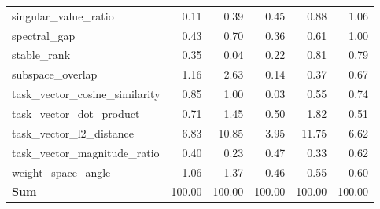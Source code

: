 \begin{table}[h]
\begin{tabular}{lrrrrr}
singular\_value\_ratio & 0.11 & 0.39 & 0.45 & 0.88 & 1.06 \\
spectral\_gap & 0.43 & 0.70 & 0.36 & 0.61 & 1.00 \\
stable\_rank & 0.35 & 0.04 & 0.22 & 0.81 & 0.79 \\
subspace\_overlap & 1.16 & 2.63 & 0.14 & 0.37 & 0.67 \\
task\_vector\_cosine\_similarity & 0.85 & 1.00 & 0.03 & 0.55 & 0.74 \\
task\_vector\_dot\_product & 0.71 & 1.45 & 0.50 & 1.82 & 0.51 \\
task\_vector\_l2\_distance & 6.83 & 10.85 & 3.95 & 11.75 & 6.62 \\
task\_vector\_magnitude\_ratio & 0.40 & 0.23 & 0.47 & 0.33 & 0.62 \\
weight\_space\_angle & 1.06 & 1.37 & 0.46 & 0.55 & 0.60 \\
\midrule
\textbf{Sum} & 100.00 & 100.00 & 100.00 & 100.00 & 100.00 \\
\bottomrule
\end{tabular}
\end{table}
